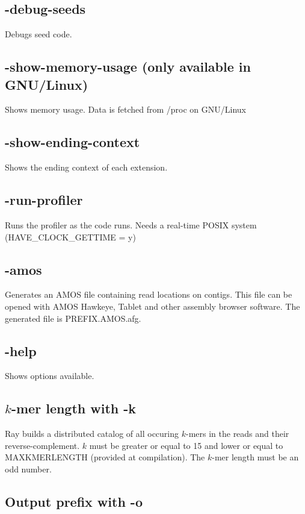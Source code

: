 \documentclass{article}
\begin{document}
\subsection{      
       -debug-seeds
}
              Debugs seed code.

\subsection{      
       -show-memory-usage (only available in GNU/Linux)
}
              Shows memory usage. Data is fetched from /proc on GNU/Linux

\subsection{      
       -show-ending-context
}
              Shows the ending context of each extension.

\subsection{      
       -run-profiler
}
              Runs the profiler as the code runs. Needs a real-time POSIX system (HAVE\_CLOCK\_GETTIME = y)

\subsection{-amos}

Generates an AMOS file containing read locations on contigs. This file can be opened with AMOS Hawkeye, Tablet and other assembly browser
software. The generated file is PREFIX.AMOS.afg.



\subsection{
-help
}
Shows options available.

\subsection{$k$-mer length with -k}

Ray builds a distributed catalog of all occuring $k$-mers in the reads and their reverse-complement. $k$ must be greater or equal to 15 and lower or equal to MAXKMERLENGTH (provided at compilation). The $k$-mer length must be an odd number.

\subsection{Output prefix with -o}
\end{document}
